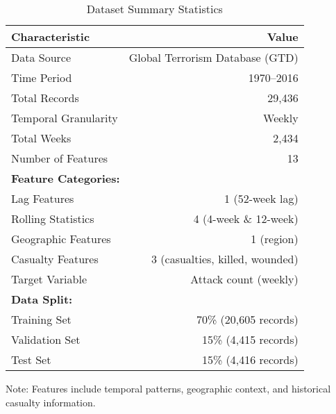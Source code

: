 \begin{table}[htbp]
\centering
\caption{Dataset Summary Statistics}
\label{tab:dataset_summary}
\begin{tabular}{lr}
\toprule
\textbf{Characteristic} & \textbf{Value} \\
\midrule
Data Source & Global Terrorism Database (GTD) \\
Time Period & 1970--2016 \\
Total Records & 29,436 \\
Temporal Granularity & Weekly \\
Total Weeks & 2,434 \\
Number of Features & 13 \\
\midrule
\multicolumn{2}{l}{\textbf{Feature Categories:}} \\
\quad Lag Features & 1 (52-week lag) \\
\quad Rolling Statistics & 4 (4-week \& 12-week) \\
\quad Geographic Features & 1 (region) \\
\quad Casualty Features & 3 (casualties, killed, wounded) \\
\quad Target Variable & Attack count (weekly) \\
\midrule
\multicolumn{2}{l}{\textbf{Data Split:}} \\
\quad Training Set & 70\% (20,605 records) \\
\quad Validation Set & 15\% (4,415 records) \\
\quad Test Set & 15\% (4,416 records) \\
\bottomrule
\end{tabular}
\begin{tablenotes}
\small
\item Note: Features include temporal patterns, geographic context, and historical casualty information.
\end{tablenotes}
\end{table}
